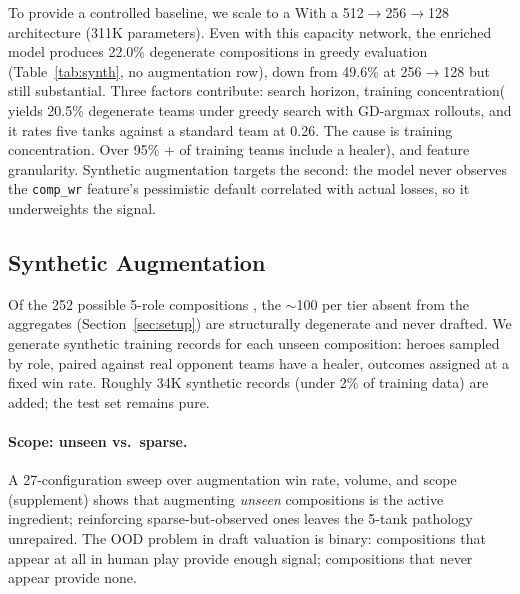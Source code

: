 \documentclass[journal]{IEEEtran}
\providecommand{\DIFaddtex}[1]{{\protect\color{blue} \sf #1}} %
\providecommand{\DIFdeltex}[1]{{\protect\color{red} \scriptsize #1}} %
\providecommand{\DIFaddbegin}{} %
\providecommand{\DIFaddend}{} %
\providecommand{\DIFdelbegin}{} %
\providecommand{\DIFdelend}{} %
\providecommand{\DIFadd}[1]{\texorpdfstring{\DIFaddtex{#1}}{#1}} %
\providecommand{\DIFdel}[1]{\texorpdfstring{\DIFdeltex{#1}}{}} %
\begin{document}
\DIFdel{To provide a controlled baseline, we scale to a }\DIFdelend \DIFaddbegin \DIFadd{With a }\DIFaddend 512$\to$256$\to$128 \DIFdelbegin \DIFdel{architecture (311K parameters). Even with this capacity}\DIFdelend \DIFaddbegin \DIFadd{network}\DIFaddend , the enriched model \DIFdelbegin \DIFdel{produces 22.0\% degenerate compositions in greedy evaluation (Table~\ref{tab:synth}, no augmentation row), down from 49.6\% at 256$\to$128 but still substantial. Three factors contribute: search horizon, training concentration(}\DIFdelend \DIFaddbegin \DIFadd{yields 20.5\% degenerate teams under greedy search with GD-argmax rollouts, and it rates five tanks against a standard team at 0.26. The cause is training concentration. Over }\DIFaddend 95\% \DIFdelbegin \DIFdel{+ }\DIFdelend of training teams \DIFdelbegin \DIFdel{include a healer), and feature granularity. Synthetic augmentation targets the second: the model never observes the \texttt{comp\_wr} feature's pessimistic default correlated with actual losses, so it underweights the signal.
}%

\subsection{\DIFdel{Synthetic Augmentation}}
\addtocounter{subsection}{-1}%

\DIFdel{Of the 252 possible 5-role compositions , the $\sim$100 per tier absent from the aggregates (Section~\ref{sec:setup}) are structurally degenerate and never drafted. We generate synthetic training records for each unseen composition: heroes sampled by role, paired against real opponent teams }\DIFdelend \DIFaddbegin \DIFadd{have a healer}\DIFaddend , \DIFdelbegin \DIFdel{outcomes assigned at a fixed win rate. Roughly 34K synthetic records (under 2\% of training data) are added; the test set remains pure.
}%

\paragraph{\DIFdel{Scope: unseen vs.\ sparse.}} %
\addtocounter{paragraph}{-1}%
\DIFdel{A 27-configuration sweep over augmentation win rate, volume, and scope (supplement) shows that augmenting \textit{unseen} compositions is the active ingredient; reinforcing sparse-but-observed ones leaves the 5-tank pathology unrepaired. The OOD problem in draft valuation is binary: compositions that appear at all in human play provide enough signal; compositions that never appear provide none.
}%
\end{document}
